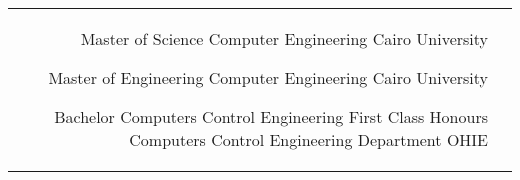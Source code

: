 \documentclass[10pt]{article} %
\begin{document}
\begin{paracol}{2}




\begin{supertabular}{rl} %

	
	{Master of Science} %
	{} %
	{Computer Engineering} %
	{Cairo University} %
	
	
	{Master of Engineering} %
	{} %
	{Computer Engineering} %
	{Cairo University} %
	
	
	{Bachelor Computers Control Engineering} %
	{First Class Honours} %
	{ Computers Control Engineering Department} %
	{OHIE} %
	

\end{supertabular}



\end{paracol}
\end{document}
